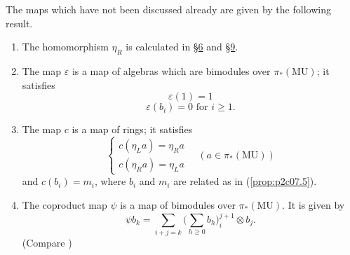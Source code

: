 \documentclass[../main]{subfiles}
\begin{document}
The maps which have not been discussed already are given by the following result. 
\begin{theorem}
\label{thm:p2c11.3}
\begin{enumerate}
    \item[(i)] The homomorphism $\eta_R$ is calculated in \hyperref[sec:p2c6]{\S 6} and \hyperref[sec:p2c9]{\S 9}.
    \item[(ii)] The map $\varepsilon$ is a map of algebras which are bimodules over $\pi_\ast(\mathrm{MU})$; it satisfies \[\varepsilon(1) = 1\] 
    \[\varepsilon(b_i) = 0 \text { for } i \ge 1.\]
    \item[(iii)] The map $c$ is a map of rings; it satisfies \[\begin{cases}c(\eta_L a) = \eta_R a \\ c(\eta_R a) = \eta_L a\end{cases} \quad (a \in \pi_\ast(\mathrm{MU}))\] and $c(b_i) = m_i$, where $b_i$ and $m_i$ are related as in (\ref{prop:p2c07.5}).
    \item[(iv)] The coproduct map $\psi$ is a map of bimodules over $\pi_\ast(\mathrm{MU})$. It is given by \[\displaystyle \psi b_k = \sum_{i + j = k} \bigg(\sum_{h \ge 0} b_h\bigg)_i^{j + 1} \otimes b_j.\] (Compare \cite[p.~20, Theorem 6.3]{adams2})
\end{enumerate}
\end{theorem}
\end{document}
